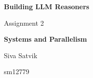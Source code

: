 \documentclass{article}
\begin{document}
\begin{titlepage}
    \centering
    \vspace*{2cm}
    
    {\Huge\bfseries Building LLM Reasoners\par}
    \vspace{0.5cm}
    {\Large Assignment 2\par}
    \vspace{2cm}
    
    {\Large\bfseries Systems and Parallelism\par}
    \vspace{3cm}
    
    {\Large Siva Satvik\par}
    \vspace{0.5cm}
    {\large sm12779\par}
    \vspace{2cm}
    
    \vfill
\end{titlepage}
\end{document}

